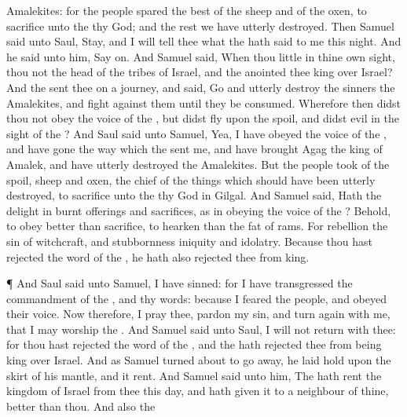 {Amalekites: for the
people
spared the
best of the
sheep and of the
oxen, to
sacrifice unto the
{} thy
God; and the
rest we have utterly
destroyed.
Then
Samuel
said unto
Saul,
Stay, and I will
tell thee what the
{} hath
said to me this
night. And he
said unto him, Say
on.
And
Samuel
said, When thou
{}
little in thine own
sight,
{} thou not
{} the
head of the
tribes of
Israel, and the
{}
anointed thee
king over
Israel?
And the
{}
sent thee on a
journey, and
said,
Go and utterly
destroy the
sinners the
Amalekites, and
fight against them until they be
consumed.
Wherefore then didst thou not
obey the
voice of the
{}, but didst
fly upon the
spoil, and
didst
evil in the
sight of the
{}?
And
Saul
said unto
Samuel, Yea, I have
obeyed the
voice of the
{}, and have
gone the
way which the
{}
sent me, and have
brought
Agag the
king of
Amalek, and have utterly
destroyed the
Amalekites.
But the
people
took of the
spoil,
sheep and
oxen, the
chief of the things which should have been utterly
destroyed, to
sacrifice unto the
{} thy
God in
Gilgal.
And
Samuel
said, Hath the
{}
{}
delight in burnt
offerings and
sacrifices, as in
obeying the
voice of the
{}? Behold, to
obey
{}
better than
sacrifice,
{} to
hearken than the
fat of
rams.
For
rebellion
{} the
sin of
witchcraft, and
stubbornness
{}
iniquity and
idolatry. Because thou hast
rejected the
word of the
{}, he hath also
rejected thee from
{}
king.
\par }{\PP {}¶ And
Saul
said unto
Samuel, I have
sinned: for I have
transgressed the
commandment of the
{}, and thy
words: because I
feared the
people, and
obeyed their
voice.
Now therefore, I pray thee,
pardon my
sin, and turn
again with me, that I may
worship the
{}.
And
Samuel
said unto
Saul, I will not
return with thee: for thou hast
rejected the
word of the
{}, and the
{} hath
rejected thee from being
king over
Israel.
And as
Samuel turned
about to go
away, he laid
hold upon the
skirt of his
mantle, and it
rent.
And
Samuel
said unto him, The
{} hath
rent the
kingdom of
Israel from thee this
day, and hath
given it to a
neighbour of thine,
{}
better than thou.
And also the
}
